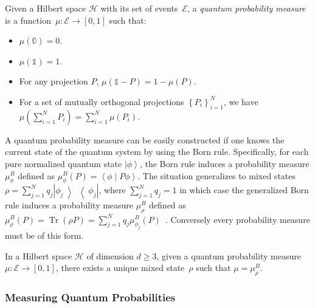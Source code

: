 \documentclass{article}
\theoremstyle{remark}
\newcommand{\Hilb}{\mathcal{H}}
\newcommand{\events}{\ensuremath{\mathcal{E}}}
\newcommand{\ket}[1]{{\left\vert{#1}\right\rangle}}
\newcommand{\op}[2]{\ensuremath{\left\vert{#1}\middle\rangle\middle\langle{#2}\right\vert}}
\newcommand{\proj}[1]{\op{#1}{#1}}
\newcommand{\ip}[2]{\ensuremath{\left\langle{#1}\middle\vert{#2}\right\rangle}}
\newcommand{\Tr}{\mathop{\mathrm{Tr}}\nolimits}
\begin{document}
\begin{definition}\label{def:QuantumProbabilitySpace}
Given a Hilbert space $\Hilb$ with its set of events~$\events$,
a \emph{quantum probability measure} is a function~$\mu:\events\rightarrow[0,1]$
such that: 
\begin{itemize}
\item $\mu(\mathbb{0})=0$. 
\item $\mu(\mathbb{1})=1$. 
\item For any projection $P$, $\mu\left(\mathbb{1}-P\right)=1-\mu\left(P\right)$. 
\item For a set of mutually orthogonal projections $\left\{ P_{i}\right\} _{i=1}^{N}$,
we have $\mu\left(\sum_{i=1}^{N}P_{i}\right)=\sum_{i=1}^{N}\mu\left(P_{i}\right)$. 
\end{itemize}
\end{definition}

\noindent A quantum probability measure can be easily constructed
if one knows the current state of the quantum system by using the
Born rule. Specifically, for each pure normalized quantum state $\ket{\phi}$,
the Born rule induces a probability measure $\mu_{\phi}^{B}$ defined
as $\mu_{\phi}^{B}(P)=\ip{\phi}{P\phi}$. The situation generalizes
to mixed states $\rho=\sum_{j=1}^{N}q_{j}\proj{\phi_{j}}$, where
$\sum_{j=1}^{N}q_{j}=1$ in which case the generalized Born rule induces
a probability measure $\mu_{\rho}^{B}$ defined as $\mu_{\rho}^{B}\left(P\right)=\Tr\left(\rho P\right)=\sum_{j=1}^{N}q_{j}\mu_{\phi_{j}}^{B}\left(P\right)$~\cite{peres1995quantum,544199,Jaeger2007}.
Conversely every probability measure must be of this form.

\begin{thm}\label{cor:Gleason's}In
a Hilbert space $\Hilb$ of dimension $d\geq3$, given a quantum probability
measure~$\mu:\events\rightarrow[0,1]$, there exists a unique mixed
state~$\rho$ such that $\mu=\mu_{\rho}^{B}$. \end{thm}



\subsubsection{Measuring Quantum Probabilities}
\end{document}
